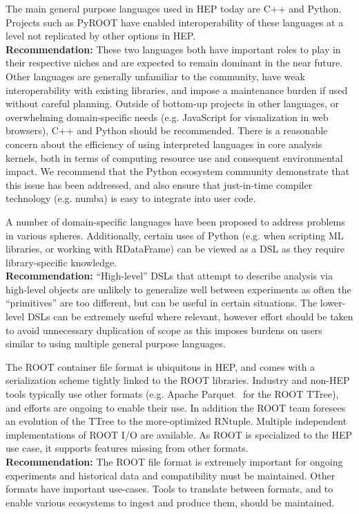 The main general purpose languages used in HEP today are C++ and Python. Projects such as PyROOT have enabled interoperability of these languages at a level not replicated by other options in HEP.\\
\textbf{Recommendation:} These two languages both have important roles to play in their respective niches and are expected to remain dominant in the near future. Other languages are generally unfamiliar to the community, have weak interoperability with existing libraries, and impose a maintenance burden if used without careful planning. Outside of bottom-up projects in other languages, or overwhelming domain-specific needs (e.g. JavaScript for visualization in web browsers), C++ and Python should be recommended. There is a reasonable concern about the efficiency of using interpreted languages in core analysis kernels, both in terms of computing resource use and consequent environmental impact. We recommend that the Python ecosystem community demonstrate that this issue has been addressed, and also ensure that just-in-time compiler technology (e.g. numba) is easy to integrate into user code.

A number of domain-specific languages have been proposed to address problems in various spheres. Additionally, certain uses of Python (e.g. when scripting ML libraries, or working with RDataFrame) can be viewed as a DSL as they require library-specific knowledge.\\
\textbf{Recommendation:} ``High-level'' DSLs that attempt to describe analysis via high-level objects are unlikely to generalize well between experiments as often the ``primitives'' are too different, but can be useful in certain situations. The lower-level DSLs can be extremely useful where relevant, however effort should be taken to avoid unnecessary duplication of scope as this imposes burdens on users similar to using multiple general purpose languages.

The ROOT container file format is ubiquitous in HEP, and comes with a serialization scheme tightly linked to the ROOT libraries. Industry and non-HEP tools typically use other formats (e.g. Apache Parquet~\cite{Parquet} for the ROOT TTree), and efforts are ongoing to enable their use. In addition the ROOT team foresees an evolution of the TTree to the more-optimized RNtuple. Multiple independent implementations of ROOT I/O are available. As ROOT is specialized to the HEP use case, it supports features missing from other formats.\\
\textbf{Recommendation:} The ROOT file format is extremely important for ongoing experiments and historical data and compatibility must be maintained. Other formats have important use-cases. Tools to translate between formats, and to enable various ecosystems to ingest and produce them, should be maintained.

